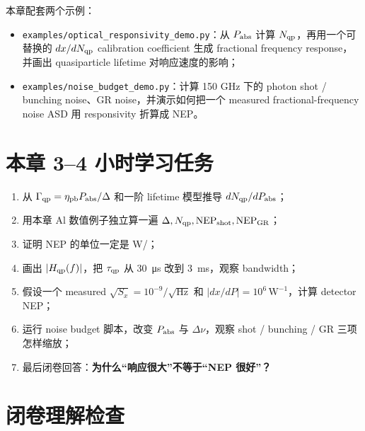 \documentclass[11pt,a4paper,openany]{ctexrep}
\begin{document}
本章配套两个示例：
\begin{itemize}
  \item \texttt{examples/optical\_responsivity\_demo.py}：从 $P_{\rm abs}$ 计算 $N_{\rm qp}$，再用一个可替换的 $dx/dN_{\rm qp}$ calibration coefficient 生成 fractional frequency response，并画出 quasiparticle lifetime 对响应速度的影响；
  \item \texttt{examples/noise\_budget\_demo.py}：计算 150 GHz 下的 photon shot / bunching noise、GR noise，并演示如何把一个 measured fractional-frequency noise ASD 用 responsivity 折算成 NEP。
\end{itemize}

\section{本章 3--4 小时学习任务}

\begin{enumerate}
  \item 从 $\Gamma_{\rm qp}=\eta_{\rm pb}P_{\rm abs}/\Delta$ 和一阶 lifetime 模型推导 $dN_{\rm qp}/dP_{\rm abs}$；
  \item 用本章 Al 数值例子独立算一遍 $\Delta,N_{\rm qp},\mathrm{NEP}_{\rm shot},\mathrm{NEP}_{\rm GR}$；
  \item 证明 NEP 的单位一定是 \si{W/}；
  \item 画出 $|H_{\rm qp}(f)|$，把 $\tau_{\rm qp}$ 从 \SI{30}{\micro s} 改到 \SI{3}{ms}，观察 bandwidth；
  \item 假设一个 measured $\sqrt{S_x}=10^{-9}/\sqrt{\mathrm{Hz}}$ 和 $|dx/dP|=10^6\,\mathrm{W^{-1}}$，计算 detector NEP；
  \item 运行 noise budget 脚本，改变 $P_{\rm abs}$ 与 $\Delta\nu$，观察 shot / bunching / GR 三项怎样缩放；
  \item 最后闭卷回答：\textbf{为什么“响应很大”不等于“NEP 很好”？}
\end{enumerate}

\section{闭卷理解检查}
\end{document}
